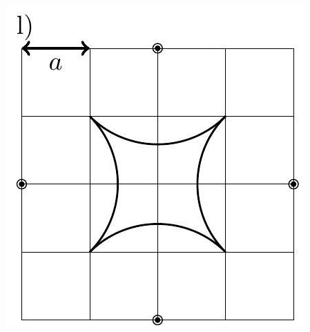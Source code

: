 \documentclass[10pt]{article}
\begin{document}
\begin{enumerate}
\includegraphics[max width=\textwidth, center]{2024_11_21_e9b4faa005d5be2cc318g-061(3)}\\

\end{enumerate}
\end{document}
